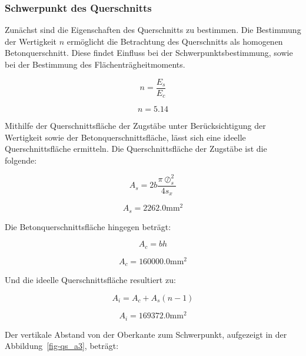 \documentclass[
  12pt,
  letterpaper,
  egregdoesnotlikesansseriftitles]{scrreprt}
\begin{document}
\hypertarget{schwerpunkt-des-querschnitts}{%
\subsubsection{Schwerpunkt des
Querschnitts}\label{schwerpunkt-des-querschnitts}}

Zunächst sind die Eigenschaften des Querschnitts zu bestimmen. Die
Bestimmung der Wertigkeit \(n\) ermöglicht die Betrachtung des
Querschnitts als homogenen Betonquerschnitt. Diese findet Einfluss bei
der Schwerpunktsbestimmung, sowie bei der Bestimmung des
Flächenträgheitmoments.

\begin{equation}n = \frac{E_{s}}{E_{c}}\end{equation}

\begin{equation}n = 5.14\end{equation}

Mithilfe der Querschnittsfläche der Zugstäbe unter Berücksichtigung der
Wertigkeit sowie der Betonquerschnittsfläche, lässt sich eine ideelle
Querschnittsfläche ermitteln. Die Querschnittsfläche der Zugstäbe ist
die folgende:

\begin{equation}A_{s} = 2 b \frac{\pi \oslash_{s}^{2}}{4 s_{x}}\end{equation}

\begin{equation}A_{s} = 2262.0 \text{mm}^{2}\end{equation}

Die Betonquerschnittsfläche hingegen beträgt:

\begin{equation}A_{c} = b h\end{equation}

\begin{equation}A_{c} = 160000.0 \text{mm}^{2}\end{equation}

Und die ideelle Querschnittsfläche resultiert zu:

\begin{equation}A_{i} = A_{c} + A_{s} \left(n - 1\right)\end{equation}

\begin{equation}A_{i} = 169372.0 \text{mm}^{2}\end{equation}

Der vertikale Abstand von der Oberkante zum Schwerpunkt, aufgezeigt in
der Abbildung~\ref{fig-qs_a3}, beträgt:
\end{document}

